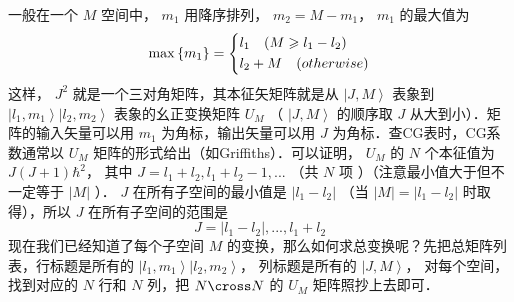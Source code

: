 一般在一个 $M$ 空间中， ${m_1}$ 用降序排列， ${m_2} = M - {m_1}$，  ${m_1}$ 的最大值为
  \begin{equation}
  \max \left\{ {{m_1}} \right\} = \left\{ \begin{gathered}
  {l_1}\quad (M \geqslant {l_1} - {l_2}) \hfill \\
  {l_2} + M\quad (otherwise) \hfill \\ 
\end{gathered}  \right.
\end{equation}
这样， ${J^2}$ 就是一个三对角矩阵，其本征矢矩阵就是从 $\left| {J,M} \right\rangle $ 表象到 $\left| {{l_1},{m_1}} \right\rangle \left| {{l_2},{m_2}} \right\rangle $ 表象的幺正变换矩阵 ${U_M}$ （ $\left| {J,M} \right\rangle $ 的顺序取 $J$ 从大到小）．矩阵的输入矢量可以用 ${m_1}$ 为角标，输出矢量可以用 $J$ 为角标．查CG表时，CG系数通常以 ${U_M}$ 矩阵的形式给出（如Griffiths）．可以证明， ${U_M}$ 的 $N$ 个本征值为 $J(J + 1){\hbar ^2}$，  其中 $J = {l_1} + {l_2},{l_1} + {l_2} - 1,...$ （共 $N$ 项%
）（注意最小值大于但不一定等于 $\left| M \right|$ ）． $J$ 在所有子空间的最小值是 $\left| {{l_1} - {l_2}} \right|$ （当 $\left| M \right| = \left| {{l_1} - {l_2}} \right|$ 时取得），所以 $J$ 在所有子空间的范围是
  \begin{equation}
  J = \left| {{l_1} - {l_2}} \right|,...,{l_1} + {l_2}
\end{equation}
现在我们已经知道了每个子空间 $M$ 的变换，那么如何求总变换呢？先把总矩阵列表，行标题是所有的 $\left| {{l_1},{m_1}} \right\rangle \left| {{l_2},{m_2}} \right\rangle $， 列标题是所有的 $\left| {J,M} \right\rangle $， 对每个空间，找到对应的 $N$ 行和 $N$ 列，把 $N \cross N$  的 ${U_M}$ 矩阵照抄上去即可．



